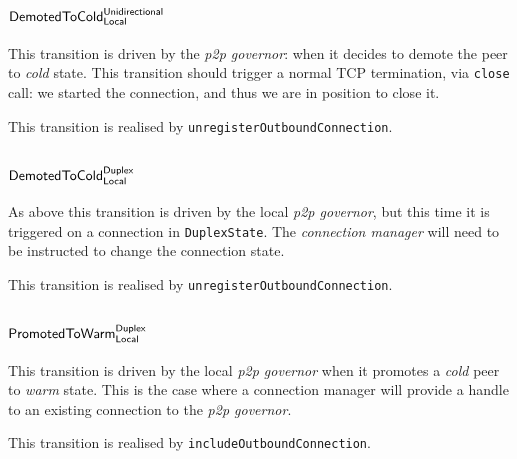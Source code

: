 \documentclass{article}
\def\TCP{\textsf{TCP}}
\def\PromotedToWarmDupLoc{$\text{\textsf{PromotedToWarm}}^\text{\textsf{Duplex}}_\text{\textsf{Local}}$}
\def\DemotedToColdDupLoc{$\text{\textsf{DemotedToCold}}^\text{\textsf{Duplex}}_\text{\textsf{Local}}$}
\def\DemotedToColdUniLoc{$\text{\textsf{DemotedToCold}}^\text{\textsf{Unidirectional}}_\text{\textsf{Local}}$}
\def\cold{\textit{cold}}
\def\warm{\textit{warm}}
\def\ptopgov{\textit{p2p governor}}
\begin{document}
\subsection{\DemotedToColdUniLoc{}}
This transition is driven by the \ptopgov{}: when it decides to demote the peer
to \cold{} state.  This transition should trigger a normal \TCP{} termination,
via \texttt{close} call: we started the connection, and thus we are in position
to close it.

This transition is realised by \texttt{unregisterOutboundConnection}.

\subsection{\DemotedToColdDupLoc{}}
As above this transition is driven by the local \ptopgov{}, but this time it is
triggered on a connection in \texttt{DuplexState}.  The \textit{connection
manager} will need to be instructed to change the connection state.

This transition is realised by \texttt{unregisterOutboundConnection}.

\subsection{\PromotedToWarmDupLoc{}}
This transition is driven by the local \ptopgov{} when it promotes a \cold{} peer
to \warm{} state.  This is the case where a connection manager will provide
a handle to an existing connection to the \ptopgov{}.

This transition is realised by \texttt{includeOutboundConnection}.
\end{document}
